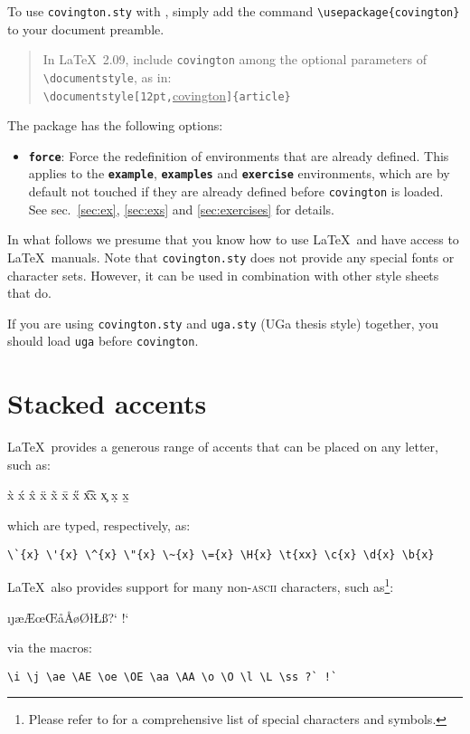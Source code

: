 \documentclass[english]{article}
\newcommand*\jenv[1]{\textbf{\texttt{#1}}}
\newcommand*\joption[1]{\textbf{\texttt{#1}}}
\begin{document}
To use \texttt{covington.sty} with \LaTeXe, simply add the command
\lstinline"\usepackage{covington}" to your document preamble.

\begin{quote}
	\footnotesize
	In \LaTeX\ 2.09,
	include \texttt{covington} among the optional parameters of 
	\lstinline"\documentstyle", as in:\\
		\lstinline"\documentstyle[12pt,"\underline{covington}\verb"]{article}"
\end{quote}
The package has the following options:
\begin{itemize}
	\item \joption{force}: Force the redefinition of environments that are already defined. This applies to the \jenv{example}, \jenv{examples} and \jenv{exercise} environments, which are by default not touched if they are already defined before \texttt{covington} is loaded. See sec.~\ref{sec:ex}, \ref{sec:exs} and \ref{sec:exercises} for details.
\end{itemize}

In what follows we presume that you know how to use \LaTeX\ and have 
access to \LaTeX\ manuals. Note that \texttt{covington.sty} does not 
provide any special fonts or character sets.  However, it can be used in 
combination with other style sheets that do.

If you are using \texttt{covington.sty} and \texttt{uga.sty} (UGa thesis style) 
together, you should load \texttt{uga} before \texttt{covington}.

 
\section{Stacked accents}\label{sec:accents}

\LaTeX\ provides a generous range of accents that can be placed on any
letter, such as:
\begin{flushleft}
\`{x} \'{x} \^{x} \"{x} \~{x} \={x} \H{x} \t{xx} \c{x} \d{x} \b{x}
\end{flushleft}
which are typed, respectively, as:
\begin{lstlisting}
\`{x} \'{x} \^{x} \"{x} \~{x} \={x} \H{x} \t{xx} \c{x} \d{x} \b{x}
\end{lstlisting}
\LaTeX\ also provides support for many non-\textsc{ascii} characters, such as\footnote{Please refer to \cite{pakin} for a comprehensive list of special characters and symbols.}:
\begin{flushleft}\obeyspaces
\i \j \ae \AE \oe \OE \aa \AA \o \O \l \L \ss ?` !`
\end{flushleft}
via the macros:
\begin{lstlisting}
\i \j \ae \AE \oe \OE \aa \AA \o \O \l \L \ss ?` !`
\end{lstlisting}
\end{document}
